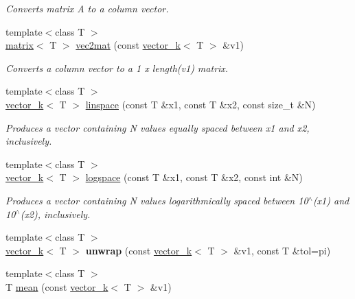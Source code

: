 \begin{DoxyCompactItemize}
\begin{DoxyCompactList}\small\item\em Converts matrix A to a column vector. \end{DoxyCompactList}\item 
\hypertarget{namespacekeycpp_a6fb905e99ba06b2a005547e7f5d0f54f}{{\footnotesize template$<$class T $>$ }\\\hyperlink{classkeycpp_1_1matrix}{matrix}$<$ T $>$ \hyperlink{namespacekeycpp_a6fb905e99ba06b2a005547e7f5d0f54f}{vec2mat} (const \hyperlink{classkeycpp_1_1vector__k}{vector\-\_\-k}$<$ T $>$ \&v1)}\label{namespacekeycpp_a6fb905e99ba06b2a005547e7f5d0f54f}

\begin{DoxyCompactList}\small\item\em Converts a column vector to a 1 x length(v1) matrix. \end{DoxyCompactList}\item 
{\footnotesize template$<$class T $>$ }\\\hyperlink{classkeycpp_1_1vector__k}{vector\-\_\-k}$<$ T $>$ \hyperlink{namespacekeycpp_ab690e7da060fb0e4c42e53cf65d76c7a}{linspace} (const T \&x1, const T \&x2, const size\-\_\-t \&N)
\begin{DoxyCompactList}\small\item\em Produces a vector containing N values equally spaced between x1 and x2, inclusively. \end{DoxyCompactList}\item 
{\footnotesize template$<$class T $>$ }\\\hyperlink{classkeycpp_1_1vector__k}{vector\-\_\-k}$<$ T $>$ \hyperlink{namespacekeycpp_a9e1c37fd71074c56e963be121e5de0f3}{logspace} (const T \&x1, const T \&x2, const int \&N)
\begin{DoxyCompactList}\small\item\em Produces a vector containing N values logarithmically spaced between 10$^\wedge$(x1) and 10$^\wedge$(x2), inclusively. \end{DoxyCompactList}\item 
\hypertarget{namespacekeycpp_a14be2eba762e42f7d04b9330d41c3f2a}{{\footnotesize template$<$class T $>$ }\\\hyperlink{classkeycpp_1_1vector__k}{vector\-\_\-k}$<$ T $>$ {\bfseries unwrap} (const \hyperlink{classkeycpp_1_1vector__k}{vector\-\_\-k}$<$ T $>$ \&v1, const T \&tol=pi)}\label{namespacekeycpp_a14be2eba762e42f7d04b9330d41c3f2a}

\item 
\hypertarget{namespacekeycpp_ae2909bfb67450be6a6d53a62752a2106}{{\footnotesize template$<$class T $>$ }\\T \hyperlink{namespacekeycpp_ae2909bfb67450be6a6d53a62752a2106}{mean} (const \hyperlink{classkeycpp_1_1vector__k}{vector\-\_\-k}$<$ T $>$ \&v1)}\label{namespacekeycpp_ae2909bfb67450be6a6d53a62752a2106}


\end{DoxyCompactItemize}
